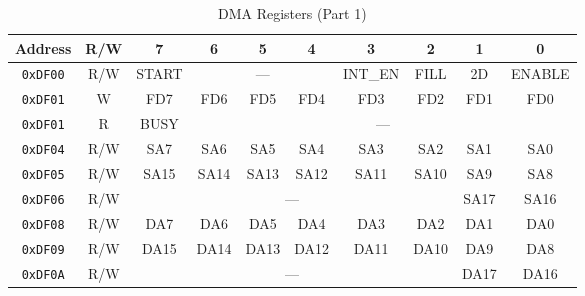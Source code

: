 \begin{table}[ht]
    \begin{center}
        \begin{tabular}{|c|c|c|c|c|c|c|c|c|c|} \hline
            Address & R/W & 7 & 6 & 5 & 4 & 3 & 2 & 1 & 0 \\\hline\hline
            \verb+0xDF00+ & R/W & START & \multicolumn{3}{|c|}{---} & INT\_EN & FILL & 2D & ENABLE \\ \hline
            \verb+0xDF01+ & W & FD7 & FD6 & FD5 & FD4 & FD3 & FD2 & FD1 & FD0 \\ \hline
            \verb+0xDF01+ & R & BUSY & \multicolumn{7}{|c|}{---}  \\ \hline\hline

            \verb+0xDF04+ & R/W & SA7 & SA6 & SA5 & SA4 & SA3 & SA2 & SA1 & SA0 \\ \hline
            \verb+0xDF05+ & R/W & SA15 & SA14 & SA13 & SA12 & SA11 & SA10 & SA9 & SA8 \\ \hline
            \verb+0xDF06+ & R/W & \multicolumn{6}{|c|}{---} & SA17 & SA16 \\ \hline\hline

            \verb+0xDF08+ & R/W & DA7 & DA6 & DA5 & DA4 & DA3 & DA2 & DA1 & DA0 \\ \hline
            \verb+0xDF09+ & R/W & DA15 & DA14 & DA13 & DA12 & DA11 & DA10 & DA9 & DA8 \\ \hline
            \verb+0xDF0A+ & R/W & \multicolumn{6}{|c|}{---} & DA17 & DA16 \\ \hline
        \end{tabular}
    \end{center}
    \caption{DMA Registers (Part 1)}
    \label{tab:dma_reg}
\end{table}

